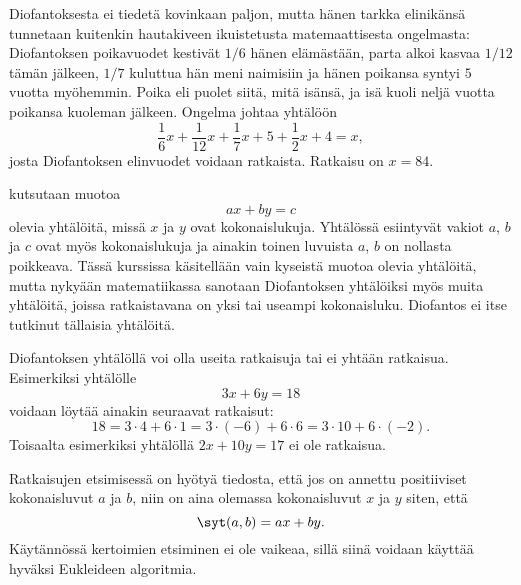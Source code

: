 Diofantoksesta ei tiedetä kovinkaan paljon, mutta hänen tarkka \hbox{elin}\-ikän\-sä tunnetaan kuitenkin hautakiveen ikuistetusta matemaattisesta ongelmasta: Diofantoksen poikavuodet kestivät $1/6$ hänen elämästään, parta alkoi kasvaa $1/12$ tämän jälkeen, $1/7$ kuluttua hän meni naimisiin ja hänen poikansa syntyi $5$ vuotta myöhemmin. Poika eli puolet siitä, mitä isänsä, ja isä kuoli neljä vuotta poikansa kuoleman jälkeen. Ongelma johtaa yhtälöön
\[
\frac{1}{6}x + \frac{1}{12} x + \frac{1}{7}x + 5 + \frac{1}{2}x+ 4=x,
\]
josta Diofantoksen elinvuodet voidaan ratkaista. Ratkaisu on $x=84$.

 kutsutaan muotoa
\[
ax + by = c
\]
olevia yhtälöitä, missä $x$ ja $y$ ovat kokonaislukuja. Yhtälössä esiintyvät vakiot $a$, $b$ ja $c$ ovat myös kokonaislukuja ja ainakin toinen luvuista $a$, $b$ on nollasta poikkeava. 
Tässä kurssissa käsitellään vain kyseistä muotoa olevia yhtälöitä, mutta nykyään matematiikassa sanotaan Diofantoksen yhtälöiksi myös muita yhtälöitä, joissa ratkaistavana on yksi tai useampi kokonaisluku. Diofantos ei itse tutkinut tällaisia yhtälöitä.

Diofantoksen yhtälöllä voi olla useita ratkaisuja tai ei yhtään ratkaisua. Esimerkiksi
yhtälölle
\[
3x + 6 y = 18
\]
voidaan löytää ainakin seuraavat ratkaisut:
\[
18 = 3\cdot 4 + 6\cdot 1 = 3\cdot (-6)+6\cdot 6 = 3\cdot10 + 6\cdot (-2).
\]
Toisaalta esimerkiksi yhtälöllä $2x+10 y =17$ ei ole ratkaisua.

Ratkaisujen etsimisessä on hyötyä tiedosta, että jos on annettu positiiviset kokonaisluvut $a$ ja $b$, niin on aina olemassa kokonaisluvut $x$ ja $y$ siten, että
\[
\syt(a, b) = ax + by.
\]
Käytännössä kertoimien etsiminen ei ole vaikeaa, sillä siinä voidaan käyttää hyväksi Eukleideen algoritmia.

